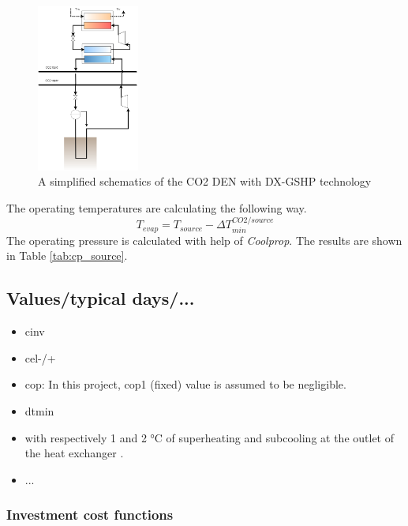 \documentclass{article}
\begin{document}
\begin{figure}[htp]
	\centering
	\includegraphics[width=0.3\textwidth]{CO2-DX-GSHP.png}
	\caption{A simplified schematics of the CO2 DEN with DX-GSHP technology}
	\label{fig:co2_gshp}
\end{figure}

The operating temperatures are calculating the following way.
\begin{equation}
    T_{evap} = T_{source} - \Delta T_{min}^{CO2/source}
\end{equation}
The operating pressure is calculated with help of \textit{Coolprop}. The results are shown in Table \ref{tab:cp_source}.



\subsection{Values/typical days/...}
\begin{itemize}
	\item cinv
	\item cel-/+
	\item cop: In this project, cop1 (fixed) value is assumed to be negligible.
	\item dtmin
	\item with respectively 1 and 2 \si{\celsius} of superheating and subcooling at the outlet of the heat exchanger \cite{}.
	\item ...
\end{itemize}

\subsubsection{Investment cost functions}
\end{document}
